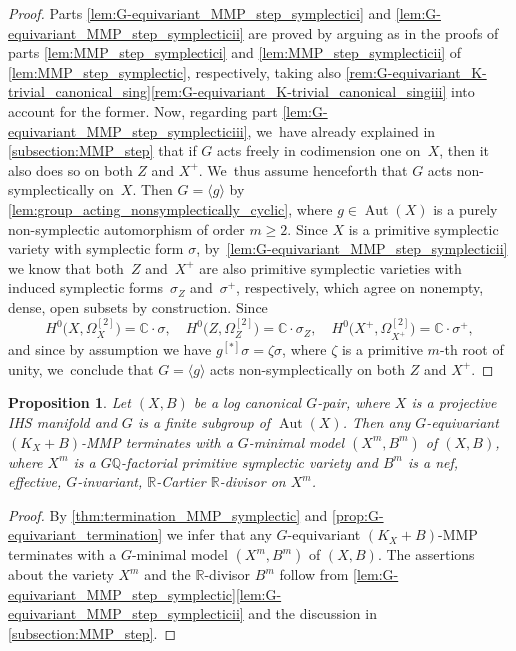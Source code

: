 \documentclass[10pt]{amsart}
\theoremstyle{plain}
\newtheorem{prop}[thm]{Proposition}
\theoremstyle{definition}
\newcommand{\Q}{\mathbb{Q}}
\newcommand{\R}{\mathbb{R}}
\newcommand{\C}{\mathbb{C}}
\DeclareMathOperator{\Aut}{Aut}
\begin{document}
\begin{proof}
Parts \eqref{lem:G-equivariant_MMP_step_symplectici} and \eqref{lem:G-equivariant_MMP_step_symplecticii} are proved by arguing as in the proofs of parts \eqref{lem:MMP_step_symplectici} and \eqref{lem:MMP_step_symplecticii} of \autoref{lem:MMP_step_symplectic}, respectively, taking also \autoref{rem:G-equivariant_K-trivial_canonical_sing}\eqref{rem:G-equivariant_K-trivial_canonical_singiii} into account for the former.
Now, regarding part \eqref{lem:G-equivariant_MMP_step_symplecticiii}, we~have already explained in \autoref{subsection:MMP_step} that if $G$ acts freely in codimension one on~$X$, then it also does so on both $Z$ and $X^+$. We~thus assume henceforth that $G$ acts non-symplectically on~$X$. Then $G = \langle g \rangle$ by \autoref{lem:group_acting_nonsymplectically_cyclic},
where $g \in \Aut(X)$ is a purely non-symplectic automorphism of order $m \geq 2$. Since $X$ is a primitive symplectic variety with symplectic form $\sigma$, by~\eqref{lem:G-equivariant_MMP_step_symplecticii} we know that both~$Z$ and~$X^+$ are also primitive symplectic varieties with induced symplectic forms~$\sigma_Z$ and~$\sigma^+$, respectively, which agree on nonempty, dense, open subsets by construction. Since
\[
H^0 \bigl(X,\Omega_{X}^{[2]} \bigr) = \C \cdot \sigma, \quad H^0 \bigl(Z,\Omega_{Z}^{[2]} \bigr) = \C \cdot \sigma_Z, \quad H^0 \bigl(X^+,\Omega_{X^+}^{[2]} \bigr) = \C \cdot \sigma^+,
\]
and since by assumption we have $g^{[*]} \sigma = \zeta \sigma $, where $\zeta$ is a primitive $m$-th root of unity, we~conclude that $G = \langle g \rangle$ acts non-symplectically on both $Z$ and $X^+$.
\end{proof}

\begin{prop}
\label{prop:IHS_G-equivariant_termination}
Let $(X,B)$ be a log canonical $G$\nobreakdash-pair, where $X$ is a projective IHS manifold and $G$ is a finite subgroup of $\Aut(X)$. Then any $G$\nobreakdash-equivariant \hbox{$(K_X+B)$}-MMP terminates with a $G$\nobreakdash-minimal model $(X^m, B^m)$ of $(X,B)$, where $X^m$ is a $G\Q$-factorial primitive symplectic variety and $B^m$ is a nef, effective, $G$\nobreakdash-invariant, $\R$-Cartier $\R$\nobreakdash-divisor on $X^m$.
\end{prop}

\begin{proof}
By \autoref{thm:termination_MMP_symplectic} and \autoref{prop:G-equivariant_termination} we infer that any $G$\nobreakdash-equivariant \hbox{$(K_X+B)$}-MMP terminates with a $G$\nobreakdash-minimal model $(X^m, B^m)$ of $(X,B)$. The assertions about the variety $X^m$ and the $\R$\nobreakdash-divisor $B^m$ follow from \autoref{lem:G-equivariant_MMP_step_symplectic}\eqref{lem:G-equivariant_MMP_step_symplecticii} and the discussion in \autoref{subsection:MMP_step}.
\end{proof}
\end{document}
